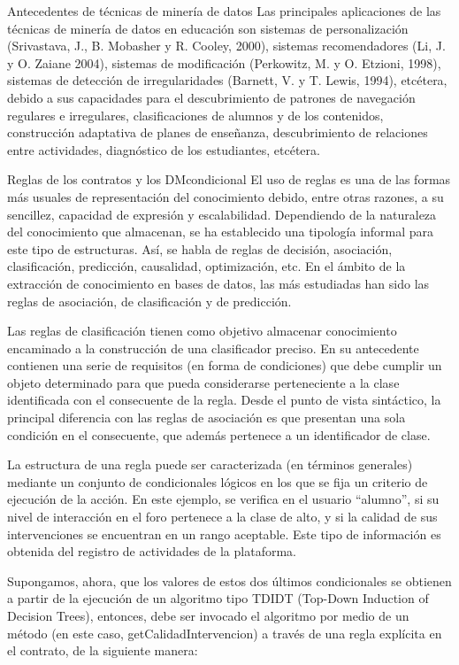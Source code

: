 Antecedentes de técnicas de minería de datos Las principales aplicaciones de las
técnicas de minería de datos en educación son sistemas de personalización
(Srivastava, J., B. Mobasher y R. Cooley, 2000), sistemas recomendadores (Li, J.
y O. Zaiane 2004), sistemas de modificación (Perkowitz, M. y O. Etzioni, 1998),
sistemas de detección de irregularidades (Barnett, V. y T. Lewis, 1994),
etcétera, debido a sus capacidades para el descubrimiento de patrones
de navegación regulares e irregulares, clasificaciones de alumnos y de los
contenidos, construcción adaptativa de planes de enseñanza, descubrimiento de
relaciones entre actividades, diagnóstico de los estudiantes, etcétera.

Reglas de los contratos y los DMcondicional El uso de reglas es una de las
formas más usuales de representación del conocimiento debido, entre otras
razones, a su sencillez, capacidad de expresión y escalabilidad. Dependiendo de
la naturaleza del conocimiento que almacenan, se ha establecido una tipología
informal para este tipo de estructuras. Así, se habla de reglas de decisión,
asociación, clasificación, predicción, causalidad, optimización, etc. En el
ámbito de la extracción de conocimiento en bases de datos, las más estudiadas
han sido las reglas de asociación, de clasificación y de predicción.


Las reglas de clasificación tienen como objetivo almacenar
conocimiento encaminado a la construcción de una clasificador preciso. En su
antecedente contienen una serie de requisitos (en forma de condiciones) que debe
cumplir un objeto determinado para que pueda considerarse perteneciente a la
clase identificada con el consecuente de la regla. Desde el punto de
vista sintáctico, la principal diferencia con las reglas de asociación es que 
presentan una sola condición en el consecuente, que además pertenece a un
identificador de clase.


La estructura de una regla puede ser caracterizada (en términos
generales) mediante un conjunto de condicionales lógicos en los que se fija un
criterio de ejecución de la acción. En este ejemplo, se verifica en el usuario
“alumno”, si su nivel de interacción en el foro pertenece a la clase de alto, y
si la calidad de sus intervenciones se encuentran en un rango aceptable. Este
tipo de información es obtenida del registro de actividades de la plataforma.


Supongamos, ahora, que los valores de estos dos últimos condicionales se
obtienen a partir de la ejecución de un algoritmo tipo TDIDT (Top-Down Induction
of Decision Trees), entonces, debe ser invocado el algoritmo por medio de un
método (en este caso, getCalidadIntervencion) a través de una regla explícita
en el contrato, de la siguiente manera:

